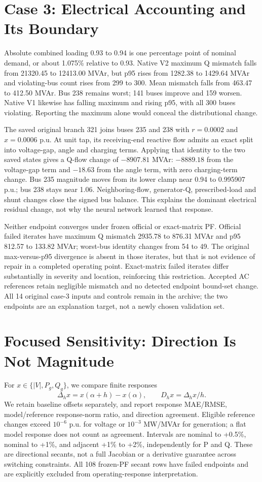 \documentclass[conference,letterpaper]{IEEEtran}
\begin{document}
\section{Case 3: Electrical Accounting and Its Boundary}
Absolute combined loading 0.93 to 0.94 is one percentage point of nominal demand, or about 1.075\% relative to 0.93. Native V2 maximum Q mismatch falls from 21320.45 to 12413.00 MVAr, but p95 rises from 1282.38 to 1429.64 MVAr and violating-bus count rises from 299 to 300. Mean mismatch falls from 463.47 to 412.50 MVAr. Bus 238 remains worst; 141 buses improve and 159 worsen. Native V1 likewise has falling maximum and rising p95, with all 300 buses violating. Reporting the maximum alone would conceal the distributional change.

The saved original branch 321 joins buses 235 and 238 with $r=0.0002$ and $x=0.0006$ p.u. At unit tap, its receiving-end reactive flow admits an exact split into voltage-gap, angle and charging terms. Applying that identity to the two saved states gives a Q-flow change of $-8907.81$ MVAr: $-8889.18$ from the voltage-gap term and $-18.63$ from the angle term, with zero charging-term change. Bus 235 magnitude moves from its lower clamp near 0.94 to 0.995907 p.u.; bus 238 stays near 1.06. Neighboring-flow, generator-Q, prescribed-load and shunt changes close the signed bus balance. This explains the dominant electrical residual change, not why the neural network learned that response.

Neither endpoint converges under frozen official or exact-matrix PF. Official failed iterates have maximum Q mismatch 2935.78 to 876.31 MVAr and p95 812.57 to 133.82 MVAr; worst-bus identity changes from 54 to 49. The original max-versus-p95 divergence is absent in those iterates, but that is not evidence of repair in a completed operating point. Exact-matrix failed iterates differ substantially in severity and location, reinforcing this restriction. Accepted AC references retain negligible mismatch and no detected endpoint bound-set change. All 14 original case-3 inputs and controls remain in the archive; the two endpoints are an explanation target, not a newly chosen validation set.

\section{Focused Sensitivity: Direction Is Not Magnitude}
For $x\in\{|V|,P_g,Q_g\}$, we compare finite responses
\begin{equation}
\Delta_h x=x(\alpha+h)-x(\alpha),\qquad D_hx=\Delta_hx/h.
\end{equation}
We retain baseline offsets separately, and report response MAE/RMSE, model/reference response-norm ratio, and direction agreement. Eligible reference changes exceed $10^{-6}$ p.u. for voltage or $10^{-3}$ MW/MVAr for generation; a flat model response does not count as agreement. Intervals are nominal to +0.5\%, nominal to +1\%, and adjacent +1\% to +2\%, independently for P and Q. These are directional secants, not a full Jacobian or a derivative guarantee across switching constraints. All 108 frozen-PF secant rows have failed endpoints and are explicitly excluded from operating-response interpretation.
\end{document}
